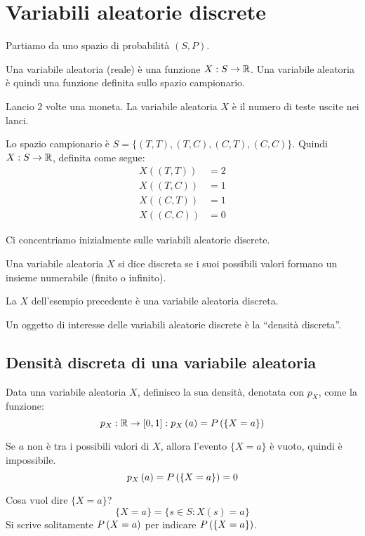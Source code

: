 \section{Variabili aleatorie discrete}

Partiamo da uno spazio di probabilit\`a $(S,P)$.
\begin{defn}
Una variabile aleatoria (reale) \`e una funzione $X : S \to \mathbb{R}$. Una variabile aleatoria \`e quindi una funzione definita sullo spazio campionario.
\end{defn}
\begin{exmp}
Lancio 2 volte una moneta. La variabile aleatoria $X$ \`e il numero di teste uscite nei lanci.

Lo spazio campionario \`e $S = \{ (T,T), (T,C), (C, T), (C, C)\}$. Quindi $X : S \to \mathbb{R}$, definita come segue:
\begin{align*}
X \left( (T,T) \right) &= 2 \\
X \left( (T,C) \right) &= 1 \\
X \left( (C,T) \right) &= 1 \\
X \left( (C,C) \right) &= 0
\end{align*}
\end{exmp}

Ci concentriamo inizialmente sulle variabili aleatorie discrete.

\begin{defn}
Una variabile aleatoria $X$ si dice discreta se i suoi possibili valori formano un insieme numerabile (finito o infinito).
\end{defn}

La $X$ dell'esempio precedente \`e una variabile aleatoria discreta.

Un oggetto di interesse delle variabili aleatorie discrete \`e la ``densit\`a discreta''.

\subsection{Densit\`a discreta di una variabile aleatoria}

\begin{defn}
Data una variabile aleatoria $X$, definisco la sua densit\`a, denotata con $p_X$, come la funzione:
\[
p_X : \mathbb{R} \to [0,1] : p_{X} \left( a \right) = P \left( {\{X = a\}} \right)
\]
\end{defn}
\begin{oss}
Se $a$ non \`e tra i possibili valori di $X$, allora l'evento $\{X = a\}$ \`e vuoto, quindi \`e impossibile.
\[
p_{X} \left( a \right) = P \left( {\{X = a\}} \right) = 0
\]
\end{oss}
Cosa vuol dire $\{X = a\}$?
\[
\{X = a\} = \{ s \in S : X(s) = a\}
\]
Si scrive solitamente $P \left( {X = a} \right)$ per indicare $P \left( {\{X = a\}} \right)$.


